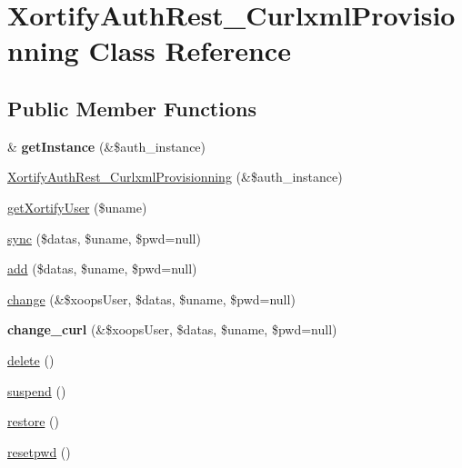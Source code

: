 \hypertarget{class_xortify_auth_rest___curlxml_provisionning}{\section{Xortify\-Auth\-Rest\-\_\-\-Curlxml\-Provisionning Class Reference}
\label{class_xortify_auth_rest___curlxml_provisionning}
}
\subsection*{Public Member Functions}
\begin{DoxyCompactItemize}
\item 
\hypertarget{class_xortify_auth_rest___curlxml_provisionning_afbdeb4d4e9bd74a2094a4e77267a4607}{\& {\bfseries get\-Instance} (\&\$auth\-\_\-instance)}\label{class_xortify_auth_rest___curlxml_provisionning_afbdeb4d4e9bd74a2094a4e77267a4607}

\item 
\hyperlink{class_xortify_auth_rest___curlxml_provisionning_a967ae46dae1162878f5ef5924aa2c78d}{Xortify\-Auth\-Rest\-\_\-\-Curlxml\-Provisionning} (\&\$auth\-\_\-instance)
\item 
\hyperlink{class_xortify_auth_rest___curlxml_provisionning_a8566a96c0201ee715a20c3dc91f18458}{get\-Xortify\-User} (\$uname)
\item 
\hyperlink{class_xortify_auth_rest___curlxml_provisionning_a3bf8375f3953a7469f36ace4f8f5fa8f}{sync} (\$datas, \$uname, \$pwd=null)
\item 
\hyperlink{class_xortify_auth_rest___curlxml_provisionning_aef5ede3ea1ef7ef53f4cc30775bf3a07}{add} (\$datas, \$uname, \$pwd=null)
\item 
\hyperlink{class_xortify_auth_rest___curlxml_provisionning_aab0a66de16832b5304207c0b080230b4}{change} (\&\$xoops\-User, \$datas, \$uname, \$pwd=null)
\item 
\hypertarget{class_xortify_auth_rest___curlxml_provisionning_aa49a67e003c75ea2157d6c49b22e6231}{{\bfseries change\-\_\-curl} (\&\$xoops\-User, \$datas, \$uname, \$pwd=null)}\label{class_xortify_auth_rest___curlxml_provisionning_aa49a67e003c75ea2157d6c49b22e6231}

\item 
\hyperlink{class_xortify_auth_rest___curlxml_provisionning_a39f291ab7533b1c56eea6e7ca71abee9}{delete} ()
\item 
\hyperlink{class_xortify_auth_rest___curlxml_provisionning_a1929add79513f500ef483c5914095d0c}{suspend} ()
\item 
\hyperlink{class_xortify_auth_rest___curlxml_provisionning_aa249c426db303d213d2cba0961a94066}{restore} ()
\item 
\hyperlink{class_xortify_auth_rest___curlxml_provisionning_a92f009325f1c64cc048b516178ab5bb7}{resetpwd} ()
\end{DoxyCompactItemize}
